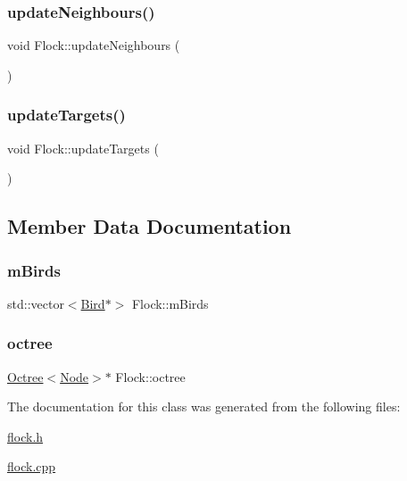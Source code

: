\mbox{\label{classFlock_a597ecc4f44495e610c7ff516d94ca560}} 
\subsubsection{\texorpdfstring{update\+Neighbours()}{updateNeighbours()}}
{\footnotesize\ttfamily void Flock\+::update\+Neighbours (\begin{DoxyParamCaption}{ }\end{DoxyParamCaption})}

\mbox{\label{classFlock_abb8739e196b8d11699f06d9670c1768b}} 
\subsubsection{\texorpdfstring{update\+Targets()}{updateTargets()}}
{\footnotesize\ttfamily void Flock\+::update\+Targets (\begin{DoxyParamCaption}{ }\end{DoxyParamCaption})}



\subsection{Member Data Documentation}
\mbox{\label{classFlock_ad742a7776e824da6281031d7d9d88d0c}} 
\subsubsection{\texorpdfstring{m\+Birds}{mBirds}}
{\footnotesize\ttfamily std\+::vector$<$\hyperlink{classBird}{Bird}$\ast$$>$ Flock\+::m\+Birds}

\mbox{\label{classFlock_a1e280f2ca46cd9c68dc31c5e3d8fec2c}} 
\subsubsection{\texorpdfstring{octree}{octree}}
{\footnotesize\ttfamily \hyperlink{classOctree}{Octree}$<$\hyperlink{structNode}{Node}$>$$\ast$ Flock\+::octree}



The documentation for this class was generated from the following files\+:\begin{DoxyCompactItemize}
\item 
\hyperlink{flock_8h}{flock.\+h}\item 
\hyperlink{flock_8cpp}{flock.\+cpp}\end{DoxyCompactItemize}
